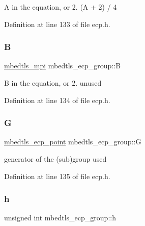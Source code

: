 \begin{DoxyEnumerate}
\item A in the equation, or 2. (A + 2) / 4 
\end{DoxyEnumerate}

Definition at line 133 of file ecp.\+h.

\mbox{\label{structmbedtls__ecp__group_ab54c9e6b1807d5c10db76f7ebedd55f4}} 
\subsubsection{\texorpdfstring{B}{B}}
{\footnotesize\ttfamily \mbox{\hyperlink{structmbedtls__mpi}{mbedtls\+\_\+mpi}} mbedtls\+\_\+ecp\+\_\+group\+::B}


\begin{DoxyEnumerate}
\item B in the equation, or 2. unused 
\end{DoxyEnumerate}

Definition at line 134 of file ecp.\+h.

\mbox{\label{structmbedtls__ecp__group_a7e0aca0789ca8f5c38d3a0c98b2f9809}} 
\subsubsection{\texorpdfstring{G}{G}}
{\footnotesize\ttfamily \mbox{\hyperlink{structmbedtls__ecp__point}{mbedtls\+\_\+ecp\+\_\+point}} mbedtls\+\_\+ecp\+\_\+group\+::G}

generator of the (sub)group used 

Definition at line 135 of file ecp.\+h.

\mbox{\label{structmbedtls__ecp__group_a3cc458ace9f663e7827a6c3556e75e64}} 
\subsubsection{\texorpdfstring{h}{h}}
{\footnotesize\ttfamily unsigned int mbedtls\+\_\+ecp\+\_\+group\+::h}

